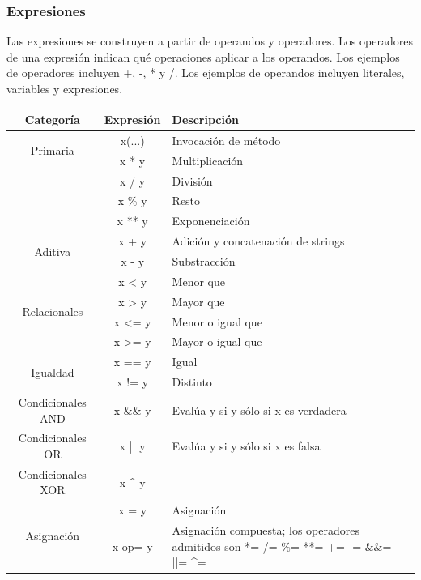 \documentclass[12pt, letterpaper,spanish]{article}
\theoremstyle{definition}
\theoremstyle{remark}
\begin{document}
	\subsubsection{Expresiones}
	Las expresiones se construyen a partir de operandos y operadores. Los operadores de una expresión indican qué operaciones aplicar a los operandos. Los ejemplos de operadores incluyen +, -, * y /. Los ejemplos de operandos incluyen literales, variables y expresiones.\par
	\begin{center}
		\begin{tabular}{| c | c | m{5cm} | }
			\hline
			Categoría & Expresión & Descripción \\ \hline
			\multirow{2}{*}{Primaria} & x(...) & Invocación de método \\ \cline{2-3}		
			\multirow{4}{*}{Multiplicativa} & x * y & Multiplicación \\ \cline{2-3}
			& x / y & División \\ \cline{2-3}
			& x \% y & Resto \\ \cline{2-3} 
			& x ** y & Exponenciación \\ \hline
			\multirow{2}{*}{Aditiva} & x + y & Adición y concatenación de strings \\ \cline{2-3}
			& x - y & Substracción \\ \hline
			\multirow{4}{*}{Relacionales} & x < y & Menor que \\ \cline{2-3} 
			& x > y & Mayor que \\ \cline{2-3}
			& x <= y & Menor o igual que \\ \cline{2-3} 
			& x >= y & Mayor o igual que \\ \hline
			\multirow{2}{*}{Igualdad} & x == y & Igual \\ \cline{2-3} 
			& x != y & Distinto \\ \hline 
			Condicionales AND & x \&\& y & Evalúa y si y sólo si x es verdadera \\ \hline
			Condicionales OR & x || y & Evalúa y si y sólo si x es falsa \\ \hline
			Condicionales XOR & x \textasciicircum{} y & \\ \hline
			\multirow{2}{*}{Asignación} & x = y & Asignación \\ \cline{2-3}
			& x op= y & Asignación compuesta; los operadores admitidos son *= /= \%= **= += -= \&\&= ||= \textasciicircum{}= \\ \hline
		\end{tabular}
	\end{center}
\end{document}
